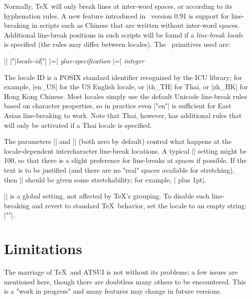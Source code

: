 \CMDI{\XeTeXlinebreaklocale}

Normally, \TeX\ will only break lines at inter-word spaces, or according to its hyphenation rules. A new feature introduced in \XeTeX\ version 0.91 is support for line-breaking in scripts such as Chinese that are written without inter-word spaces. Additional line-break positions in such scripts will be found if a {\em line-break locale} is specified (the rules may differ between locales). The \XeTeX\ primitives used are:%
{\obeylines \parskip0pt \parindent
  |\XeTeXlinebreaklocale| |"|{\em locale-id}|"|
  |\XeTeXlinebreakskip =| {\em glue-specification}
  |\XeTeXlinebreakpenalty =| {\em integer}\par}\noindent
The locale ID is a POSIX standard identifier recognized by the ICU library; for example, |en_US| for the US English locale, or |th_TH| for Thai, or |zh_HK| for Hong Kong Chinese. Most locales simply use the default Unicode line-break rules based on character properties, so in practice even |\XeTeXlinebreaklocale "en"| is sufficient for East Asian line-breaking to work. Note that Thai, however, has additional rules that will only be activated if a Thai locale is specified.


\CMDI{\XeTeXlinebreakskip}

\CMDI{\XeTeXlinebreakpenalty}

The parameters |\XeTeXlinebreakskip| and |\XeTeXlinebreakpenalty| (both zero by default) control what happens at the locale-dependent intercharacter line-break locations. A typical |\XeTeXlinebreakpenalty| setting might be 100, so that there is a slight preference for line-breaks at spaces if possible. If the text is to be justified (and there are no "real" spaces available for stretching), then |\XeTeXlinebreakskip| should be given some stretchability; for example, |\XeTeXlinebreakskip=0pt plus 1pt|.


\CMDI{\XeTeXlinebreaklocale} 

|\XeTeXlinebreaklocale| is a global setting, not affected by \TeX's grouping. To disable such line-breaking and revert to standard \TeX\ behavior, set the locale to an empty string: |\XeTeXlinebreaklocale ""|.

\section{Limitations}

The marriage of \TeX\ and ATSUI is not without its problems; a few issues are mentioned here, though there are doubtless many others to be encountered. This is a "work in progress" and many features may change in future versions.

